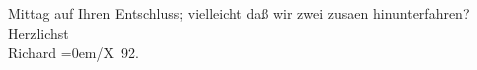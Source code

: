 \begin{ledgroupsized}[t]{13cm}
                        Mittag auf Ihren Entschluss; vielleicht daß wir zwei zusa{\geminationm}en {\pb}hinunterfahren?\pend
           \pstart
           Herzlichst{\\[\baselineskip]}\spacefill\mbox{Richard}\pend
           \leftskip=0em{}/X 92.\pend
           \endnumbering{}\end{ledgroupsized}  \newcommand{\dateiname}{L00125}\newcommand{\titel}{Richard Beer-Hofmann an Arthur Schnitzler, 1. 10. 1892}\newcommand{\editorInnen}{ Martin Anton Müller und Gerd-Hermann Susen}
      